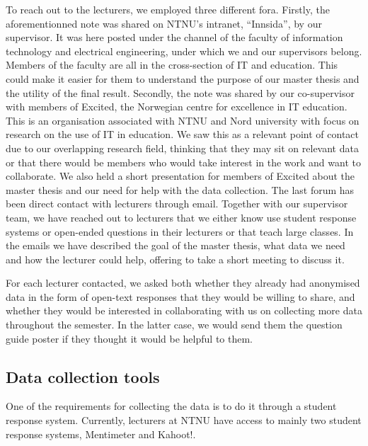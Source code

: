 To reach out to the lecturers, we employed three different fora. Firstly, the aforementionned note was shared on NTNU's intranet, ``Innsida'', by our supervisor. It was here posted under the channel of the faculty of information technology and electrical engineering, under which we and our supervisors belong. Members of the faculty are all in the cross-section of IT and education. This could make it easier for them to understand the purpose of our master thesis and the utility of the final result. Secondly, the note was shared by our co-supervisor with members of Excited, the Norwegian centre for excellence in IT education. This is an organisation associated with NTNU and Nord university with focus on research on the use of IT in education. We saw this as a relevant point of contact due to our overlapping research field, thinking that they may sit on relevant data or that there would be members who would take interest in the work and want to collaborate. We also held a short presentation for members of Excited about the master thesis and our need for help with the data collection. The last forum has been direct contact with lecturers through email. Together with our supervisor team, we have reached out to lecturers that we either know use student response systems or open-ended questions in their lecturers or that teach large classes. In the emails we have described the goal of the master thesis, what data we need and how the lecturer could help, offering to take a short meeting to discuss it.

For each lecturer contacted, we asked both whether they already had anonymised data in the form of open-text responses that they would be willing to share, and whether they would be interested in collaborating with us on collecting more data throughout the semester. In the latter case, we would send them the question guide poster if they thought it would be helpful to them.

\subsection{Data collection tools}
One of the requirements for collecting the data is to do it through a student response system. Currently, lecturers at NTNU have access to mainly two student response systems, Mentimeter and Kahoot!.

